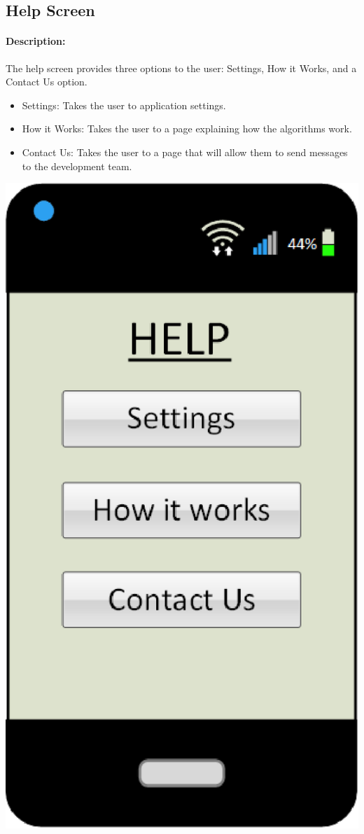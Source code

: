 \documentclass[a4paper]{article}
\begin{document}
\subsection{Help Screen}
\paragraph{Description:} The help screen provides three options to the user: Settings, How it Works, and a Contact Us option.
\begin{itemize}
\item Settings: Takes the user to application settings.
\item How it Works: Takes the user to a page explaining how the algorithms work.
\item Contact Us: Takes the user to a page that will allow them to send messages to the development team.
\end{itemize}
\begin{center}\includegraphics[scale=.8]{Help.eps}\end{center}
\pagebreak
\end{document}
